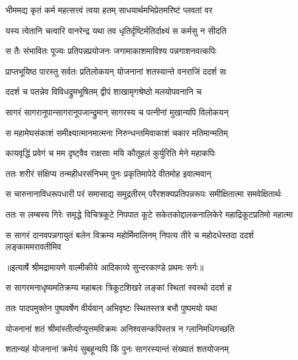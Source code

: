 \twolineshloka
{भीममद्य कृतं कर्म महत्सत्त्वं त्वया हतम्}
{साधयार्थमभिप्रेतमरिष्टं प्लवतां वर} %

\twolineshloka
{यस्य त्वेतानि चत्वारि वानरेन्द्र यथा तव}
{धृतिर्दृष्टिर्मतिर्दाक्ष्यं स कर्मसु न सीदति} %

\twolineshloka
{स तैः संभावितः पूज्यः प्रतिपन्नप्रयोजनः}
{जगामाकाशमाविश्य पन्नगाशनवत्कपिः} %

\twolineshloka
{प्राप्तभूयिष्ठ पारस्तु सर्वतः प्रतिलोकयन्}
{योजनानां शतस्यान्ते वनराजिं ददर्श सः} %

\twolineshloka
{ददर्श च पतन्नेव विविधद्रुमभूषितम्}
{द्वीपं शाखामृगश्रेष्ठो मलयोपवनानि च} %

\twolineshloka
{सागरं सागरानूपान्सागरानूपजान्द्रुमान्}
{सागरस्य च पत्नीनां मुखान्यपि विलोकयन्} %

\twolineshloka
{स महामेघसंकाशं समीक्ष्यात्मानमात्मना}
{निरुन्धन्तमिवाकाशं चकार मतिमान्मतिम्} %

\twolineshloka
{कायवृद्धिं प्रवेगं च मम दृष्ट्वैव राक्षसाः}
{मयि कौतूहलं कुर्युरिति मेने महाकपिः} %

\twolineshloka
{ततः शरीरं संक्षिप्य तन्महीधरसंनिभम्}
{पुनः प्रकृतिमापेदे वीतमोह इवात्मवान्} %

\fourlineindentedshloka
{स चारुनानाविधरूपधारी}
{ परं समासाद्य समुद्रतीरम्}
{परैरशक्यप्रतिपन्नरूपः}
{ समीक्षितात्मा समवेक्षितार्थः} %

\fourlineindentedshloka
{ततः स लम्बस्य गिरेः समृद्धे}
{ विचित्रकूटे निपपात कूटे}
{सकेतकोद्दालकनालिकेरे}
{ महाद्रिकूटप्रतिमो महात्मा} %

\fourlineindentedshloka
{स सागरं दानवपन्नगायुतं}
{ बलेन विक्रम्य महोर्मिमालिनम्}
{निपत्य तीरे च महोदधेस्तदा}
{ ददर्श लङ्काममरावतीमिव} %


{॥इत्यार्षे श्रीमद्रामायणे वाल्मीकीये आदिकाव्ये सुन्दरकाण्डे प्रथमः सर्गः॥}


\twolineshloka
{स सागरमनाधृष्यमतिक्रम्य महाबलः}
{त्रिकूटशिखरे लङ्कां स्थितां स्वस्थो ददर्श ह} %

\twolineshloka
{ततः पादपमुक्तेन पुष्पवर्षेण वीर्यवान्}
{अभिवृष्टः स्थितस्तत्र बभौ पुष्पमयो यथा} %

\twolineshloka
{योजनानां शतं श्रीमांस्तीर्त्वाप्युत्तमविक्रमः}
{अनिश्वसन्कपिस्तत्र न ग्लानिमधिगच्छति} %

\twolineshloka
{शतान्यहं योजनानां क्रमेयं सुबहून्यपि}
{किं पुनः सागरस्यान्तं संख्यातं शतयोजनम्} %

